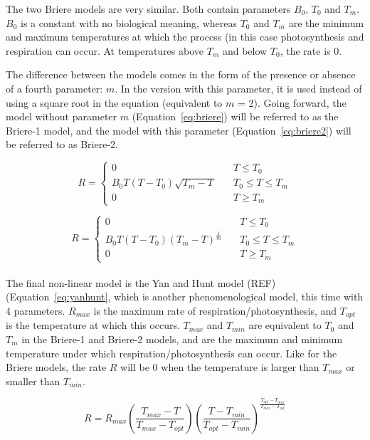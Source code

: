 \documentclass[11pt]{article}
\begin{document}
	The two Briere models are very similar. Both contain parameters $B_0$, $T_0$ and $T_m$. $B_0$ is a constant with no biological meaning, whereas $T_0$ and $T_m$ are the minimum and maximum temperatures at which the process (in this case photosynthesis and respiration can occur. At temperatures above $T_m$ and below $T_0$, the rate is 0.
	
	The difference between the models comes in the form of the presence or absence of a fourth parameter: $m$. In the version with this parameter, it is used instead of using a square root in the equation (equivalent to $m$ = 2). Going forward, the model without parameter $m$ (Equation~\ref{eq:briere}) will be referred to as the Briere-1 model, and the model with this parameter (Equation~\ref{eq:briere2}) will be referred to as Briere-2.
	
	
	\begin{equation} \label{eq:briere}
	R = \left\{
			\begin{array}{ll}
			0 & \quad T \leq T_0 \\
            B_0 T (T-T_0) \sqrt{T_m - T} & \quad T_0 \leq T \leq T_m \\
            0 & \quad T \geq T_m
			\end{array}
	\right.
	\end{equation}
	
	\begin{equation} \label{eq:briere2}
	R = \left\{
			\begin{array}{ll}
			0 & \quad T \leq T_0 \\
            B_0 T (T-T_0) (T_m-T)^\frac{1}{m} & \quad T_0 \leq T \leq T_m \\
            0 & \quad T \geq T_m
			\end{array}
	\right.
	\end{equation}
	\\
	The final non-linear model is the Yan and Hunt model (REF) (Equation~\ref{eq:yanhunt}, which is another phenomenological model, this time with 4 parameters. $R_{max}$ is the maximum rate of respiration/photosynthesis, and $T_{opt}$ is the temperature at which this occurs. $T_{max}$ and $T_{min}$ are equivalent to $T_0$ and $T_m$ in the Briere-1 and Briere-2 models, and are the maximum and minimum temperature under which respiration/photosynthesis can occur. Like for the Briere models, the rate $R$ will be 0 when the temperature is larger than $T_{max}$ or smaller than $T_{min}$.
	
	\begin{equation} \label{eq:yanhunt}
	R = R_{max} 
		\left(
			\frac{T_{max} - T}{T_{max} - T_{opt}}
		\right) 
		\left(
			\frac{T - T_{min}}{T_{opt} - T_{min}}
		\right)
			^\frac{T_{opt} - T_{min}}{T_{max} - T_{opt}}
	\end{equation}
\end{document}
